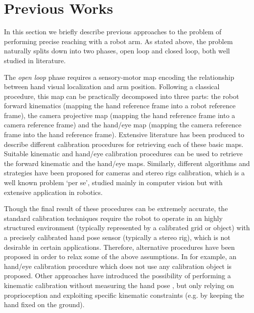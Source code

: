 \section{Previous Works}



In this section we briefly describe previous approaches to the problem of 
performing precise reaching with a robot arm. As stated above, the problem 
naturally splits down into two phases, open loop and closed loop, both well 
studied in literature.

The {\em open loop} phase requires a sensory-motor map encoding the relationship between hand visual localization and arm position. Following a classical procedure, this map can be practically decomposed into three parts: the robot forward kinematics (mapping the hand reference frame into a robot reference frame), the camera projective map (mapping the hand reference frame into a camera reference frame) and the hand/eye map (mapping the camera reference frame into the hand reference frame). Extensive literature has been produced to describe different calibration procedures for retrieving each of these basic maps. Suitable kinematic \cite{Hollerbach96calibration} and hand/eye \cite{Tsai88calibration} calibration procedures can be used to retrieve the forward kinematic and the hand/eye maps. Similarly, different algorithms and strategies have been proposed for cameras and stereo rigs calibration, which is a well known problem `per se', studied mainly in computer vision \cite{Soatto03vision} but with extensive application in robotics. 

Though the final result of these procedures can be extremely accurate, the standard calibration techniques require the robot to operate in an highly structured environment (typically represented by a calibrated grid or object) with a precisely calibrated hand pose sensor (typically a stereo rig), which is not desirable in certain applications. Therefore, alternative procedures have been proposed in order to relax some of the above assumptions. In \cite{AHE01} for example, an hand/eye calibration procedure which does not use any calibration object is proposed. Other approaches have introduced the possibility of performing a kinematic calibration without measuring the hand pose \cite{Bennett91calibration}, but only relying on proprioception and exploiting specific kinematic constraints (e.g. by keeping the hand fixed on the ground).

